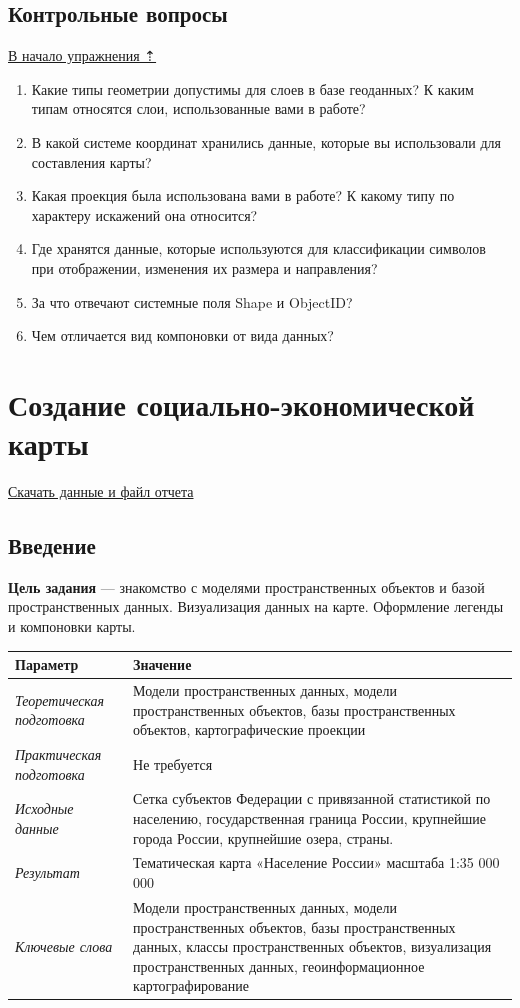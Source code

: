 \documentclass[12pt,]{book}
\begin{document}
\hypertarget{map-design-climates-questions}{%
\section{Контрольные вопросы}\label{map-design-climates-questions}}

\protect\hyperlink{map-design-climates}{В начало упражнения ⇡}

\begin{enumerate}
\def\labelenumi{\arabic{enumi}.}
\item
  Какие типы геометрии допустимы для слоев в базе геоданных? К каким типам относятся слои, использованные вами в работе?
\item
  В какой системе координат хранились данные, которые вы использовали для составления карты?
\item
  Какая проекция была использована вами в работе? К какому типу по характеру искажений она относится?
\item
  Где хранятся данные, которые используются для классификации символов при отображении, изменения их размера и направления?
\item
  За что отвечают системные поля Shape и ObjectID?
\item
  Чем отличается вид компоновки от вида данных?
\end{enumerate}

\hypertarget{map-design-economic}{%
\chapter{Создание социально-экономической карты}\label{map-design-economic}}

\href{http://autolab.geogr.msu.ru/gis/data/Ex04.zip}{Скачать данные и файл отчета}

\hypertarget{map-design-economic-intro}{%
\section{Введение}\label{map-design-economic-intro}}

\textbf{Цель задания} --- знакомство с моделями пространственных объектов и базой пространственных данных. Визуализация данных на карте. Оформление легенды и компоновки карты.

\begin{longtable}[]{@{}ll@{}}
\toprule
Параметр & Значение\tabularnewline
\midrule
\endhead
\emph{Теоретическая подготовка} & Модели пространственных данных, модели пространственных объектов, базы пространственных объектов, картографические проекции\tabularnewline
\emph{Практическая подготовка} & Не требуется\tabularnewline
\emph{Исходные данные} & Сетка субъектов Федерации с привязанной статистикой по населению, государственная граница России, крупнейшие города России, крупнейшие озера, страны.\tabularnewline
\emph{Результат} & Тематическая карта «Население России» масштаба 1:35 000 000\tabularnewline
\emph{Ключевые слова} & Модели пространственных данных, модели пространственных объектов, базы пространственных данных, классы пространственных объектов, визуализация пространственных данных, геоинформационное картографирование\tabularnewline
\bottomrule
\end{longtable}
\end{document}
